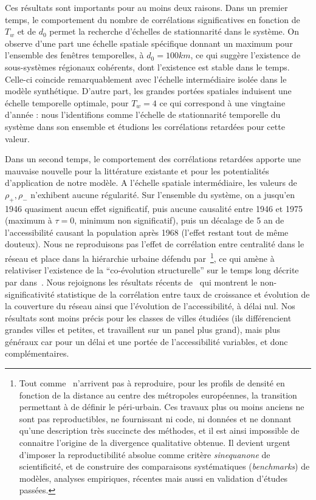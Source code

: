 Ces résultats sont importants pour au moins deux raisons. Dans un premier temps, le comportement du nombre de corrélations significatives en fonction de $T_w$ et de $d_0$ permet la recherche d'échelles de stationnarité dans le système. On observe d'une part une échelle spatiale spécifique donnant un maximum pour l'ensemble des fenêtres temporelles, à $d_0 = 100km$, ce qui suggère l'existence de sous-systèmes régionaux cohérents, dont l'existence est stable dans le temps. Celle-ci coincide remarquablement avec l'échelle intermédiaire isolée dans le modèle synthétique. D'autre part, les grandes portées spatiales induisent une échelle temporelle optimale, pour $T_w = 4$ ce qui correspond à une vingtaine d'année : nous l'identifions comme l'échelle de stationnarité temporelle du système dans son ensemble et étudions les corrélations retardées pour cette valeur.


Dans un second temps, le comportement des corrélations retardées apporte une mauvaise nouvelle\comment[AB]{:-)} pour la littérature existante et pour les potentialités d'application de notre modèle. A l'échelle spatiale intermédiaire, les valeurs de $\rho_+,\rho_-$ n'exhibent aucune régularité. Sur l'ensemble du système, on a jusqu'en 1946 quasiment aucun effet significatif, puis aucune causalité entre 1946 et 1975 (maximum à $\tau = 0$, minimum non significatif), puis un décalage de 5 an de l'accessibilité causant la population après 1968 (l'effet restant tout de même douteux). Nous ne reproduisons pas l'effet de corrélation entre centralité dans le réseau et place dans la hiérarchie urbaine défendu par~\cite{bretagnolle2003vitesse}\footnote{Tout comme~\cite{lemoy2017scaling} n'arrivent pas à reproduire, pour les profils de densité en fonction de la distance au centre des métropoles européennes, la transition permettant à \cite{guerois2008built} de définir le péri-urbain. Ces travaux plus ou moins anciens ne sont pas reproductibles, ne fournissant ni code, ni données et ne donnant qu'une description très succincte des méthodes, et il est ainsi impossible de connaitre l'origine de la divergence qualitative obtenue. Il devient urgent d'imposer la reproductibilité absolue comme critère \emph{sinequanone} de scientificité, et de construire des comparaisons systématiques (\emph{benchmarks}) de modèles, analyses empiriques, récentes mais aussi en validation d'études passées.}, ce qui amène à relativiser l'existence de la ``co-évolution structurelle'' sur le temps long décrite par  dans~\cite{espacegeo2014effets}. Nous rejoignons les résultats récents de~\cite{mimeur:hal-01616746} qui montrent le non-significativité statistique de la corrélation entre taux de croissance et évolution de la couverture du réseau ainsi que l'évolution de l'accessibilité, à délai nul. Nos résultats sont moins précis pour les classes de villes étudiées (ils différencient grandes villes et petites, et travaillent sur un panel plus grand), mais plus généraux car pour un délai et une portée de l'accessibilité variables, et donc complémentaires.



